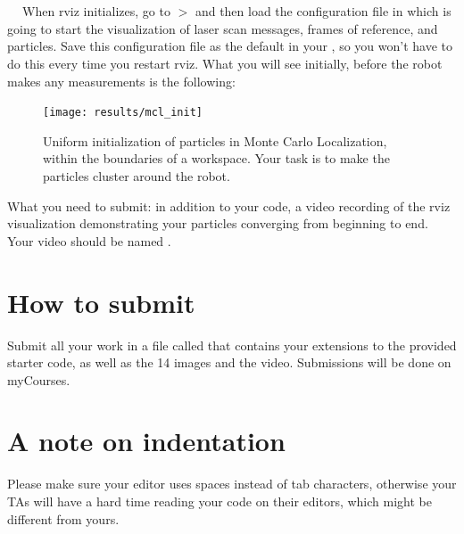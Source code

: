 \documentclass[a4paper,10pt]{article}
\begin{document}
   $\;$  $\;$ 
  
   $\;$  $\;$ 
  
   $\;$  $\;$  
\newline
\newline
\noindent When rviz initializes, go to  $>$  and then load the configuration file in 
which is going to start the visualization of laser scan messages, frames of reference, and particles. Save this configuration file as the default
in your , so you won't have to do this every time you restart rviz. What you will see initially, before the robot makes any measurements 
is the following:
\begin{figure}[h!]
  \begin{center}
    \texttt{[image: results/mcl\_init]}
   \end{center}
   \caption{Uniform initialization of particles in Monte Carlo Localization, within the boundaries of a workspace. Your task is to make the particles cluster around the robot.}
\end{figure}
\newline
\newline
\newline
\noindent What you need to submit: in addition to your code, a video recording of the rviz visualization demonstrating your particles converging from beginning to end. Your video 
should be named . 


\section{How to submit}
Submit all your work in a file called  that contains your extensions to the provided starter code, as well as the 14 images and the video. 
Submissions will be done on myCourses. 

\section{A note on indentation}
Please make sure your editor uses spaces instead of tab characters, otherwise your TAs will have a hard time reading your code on their editors, which might be different from yours.
\end{document}

